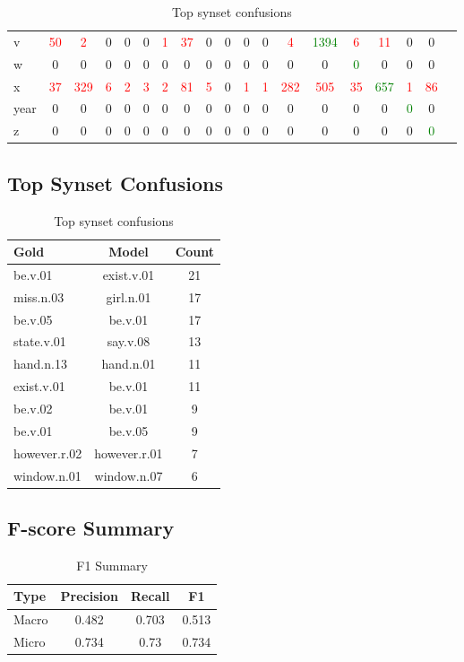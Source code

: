 \documentclass[12pt,a4paper]{article}
\begin{document}
\begin{table}[H]
{\begin{tabular}{lcccccccccccccccccc}
v & \textcolor{red}{50} & \textcolor{red}{2} & 0 & 0 & 0 & \textcolor{red}{1} & \textcolor{red}{37} & 0 & 0 & 0 & 0 & \textcolor{red}{4} & \textcolor{green}{1394} & \textcolor{red}{6} & \textcolor{red}{11} & 0 & 0 \\
w & 0 & 0 & 0 & 0 & 0 & 0 & 0 & 0 & 0 & 0 & 0 & 0 & 0 & \textcolor{green}{0} & 0 & 0 & 0 \\
x & \textcolor{red}{37} & \textcolor{red}{329} & \textcolor{red}{6} & \textcolor{red}{2} & \textcolor{red}{3} & \textcolor{red}{2} & \textcolor{red}{81} & \textcolor{red}{5} & 0 & \textcolor{red}{1} & \textcolor{red}{1} & \textcolor{red}{282} & \textcolor{red}{505} & \textcolor{red}{35} & \textcolor{green}{657} & \textcolor{red}{1} & \textcolor{red}{86} \\
year & 0 & 0 & 0 & 0 & 0 & 0 & 0 & 0 & 0 & 0 & 0 & 0 & 0 & 0 & 0 & \textcolor{green}{0} & 0 \\
z & 0 & 0 & 0 & 0 & 0 & 0 & 0 & 0 & 0 & 0 & 0 & 0 & 0 & 0 & 0 & 0 & \textcolor{green}{0} \\
\hline
\end{tabular}
}

\subsection*{Top Synset Confusions}
\begin{table}[H]
\centering
\caption{Top synset confusions}
\begin{tabular}{lcc}
\toprule
Gold & Model & Count\\
\midrule
be.v.01 & exist.v.01 & 21\\
miss.n.03 & girl.n.01 & 17\\
be.v.05 & be.v.01 & 17\\
state.v.01 & say.v.08 &13\\
hand.n.13 & hand.n.01 &11\\
exist.v.01 & be.v.01 & 11\\
be.v.02 & be.v.01 & 9\\
be.v.01 & be.v.05 & 9\\
however.r.02 & however.r.01 & 7\\
window.n.01 & window.n.07 & 6\\
\bottomrule
\end{tabular}
\end{table}

\end{table}

\subsection*{F-score Summary}
\begin{table}[H]
\centering
\caption{F1 Summary}
\begin{tabular}{lccc}
\toprule
Type & Precision & Recall & F1\\
\midrule
Macro & 0.482 & 0.703 & 0.513\\
Micro & 0.734 & 0.73 & 0.734\\
\bottomrule
\end{tabular}
\end{table}
\end{document}
